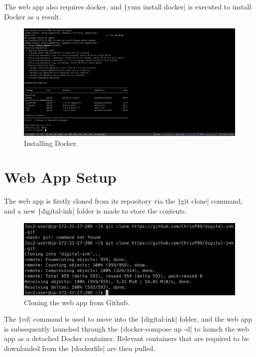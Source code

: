 The web app also requires docker, and \texttt|yum install docker| is executed to install Docker as a result.

\begin{figure}[!htbp]
    \centering
    \includegraphics[width=140mm]{resources/ec2/installing-docker}
    \caption{Installing Docker.}
    \label{fig:webapp-docker}
\end{figure}

\clearpage
\section{Web App Setup}\label{sec:web-app-setup2}

The web app is firstly cloned from its repository via the \texttt|git clone| command, and a new
\texttt|digital-ink| folder is made to store the contents.

\begin{figure}[!htbp]
    \centering
    \includegraphics[width=125mm]{resources/ec2/webapp-clone}
    \caption{Cloning the web app from Github.}
    \label{fig:webapp-clone}
\end{figure}

The \texttt|cd| command is used to move into the \texttt|digital-ink| folder, and the web app is
subsequently launched through the \texttt|docker-compose up -d| to launch the web app as a detached Docker
container.
Relevant containers that are required to be downloaded from the \texttt|dockerfile| are then pulled.

